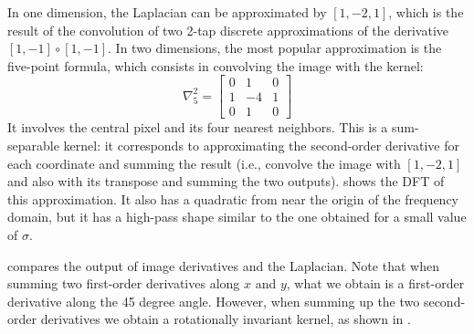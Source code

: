 
In one dimension, the Laplacian can be approximated by $\left[ 1,-2,1 \right]$, which is the result of the convolution of two 2-tap discrete approximations of the derivative $\left[1,-1 \right] \circ \left[1,-1 \right]$.
In two dimensions, the most popular approximation is the five-point formula, which consists in convolving the image with the kernel:
\begin{equation}
	\nabla_5^2 =
	\begin{bmatrix}
		0 & 1  & 0 \\
		1 & -4 & 1 \\
		0 & 1  & 0
	\end{bmatrix}
	\label{eq:five_point_laplacian}
\end{equation}
It involves the central pixel and its four nearest neighbors. This is a sum-separable kernel: it corresponds to approximating the second-order derivative for each coordinate and summing the result (i.e., convolve the image with $\left[1,-2,1\right]$ and also with its transpose and summing the two outputs).
 shows the DFT of this approximation. It also has a quadratic from near the origin of the frequency domain, but it has a high-pass shape similar to the one obtained for a small value of $\sigma$.



\Fig{\ref{fig:wheellaplacian}} compares the output of image derivatives and the Laplacian. Note that when summing two first-order derivatives along $x$ and $y$, what we obtain is a first-order derivative along the 45 degree angle. However, when summing up the two second-order derivatives we obtain a rotationally invariant kernel, as shown in .


